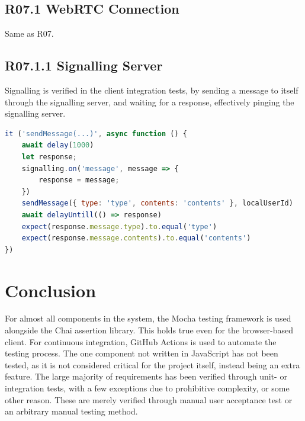 \subsection{R07.1 WebRTC Connection}
\label{vR07.1}

Same as R07.

\subsection{R07.1.1 Signalling Server}
\label{vR07.1.1}

Signalling is verified in the client integration tests, by sending a message to itself through the signalling server, and waiting for a response, effectively pinging the signalling server. 

\begin{lstlisting}[language=JavaScript]
it ('sendMessage(...)', async function () {
    await delay(1000)
    let response;
    signalling.on('message', message => {
        response = message;
    })
    sendMessage({ type: 'type', contents: 'contents' }, localUserId)
    await delayUntill(() => response)
    expect(response.message.type).to.equal('type')
    expect(response.message.contents).to.equal('contents')
})
\end{lstlisting}

\section{Conclusion}

For almost all components in the system, the Mocha testing framework is used alongside the Chai assertion library. This holds true even for the browser-based client. For continuous integration, GitHub Actions is used to automate the testing process. The one component not written in JavaScript has not been tested, as it is not considered critical for the project itself, instead being an extra feature. The large majority of requirements has been verified through unit- or integration tests, with a few exceptions due to prohibitive complexity, or some other reason. These are merely verified through manual user acceptance test or an arbitrary manual testing method.